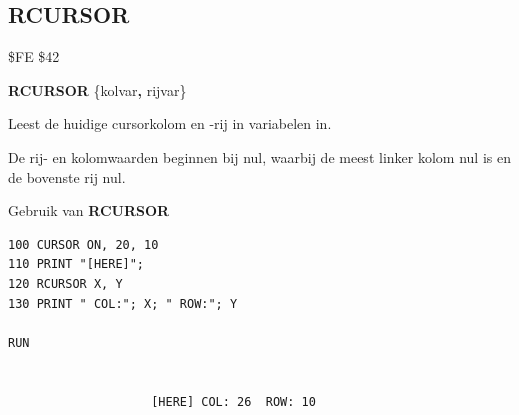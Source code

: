 \subsection{RCURSOR}
\begin{description}[leftmargin=2cm,style=nextline]
\item [Token:]    \$FE \$42

\item [Formaat:]   {\bf RCURSOR} \{kolvar{\bf,} rijvar\}

\item [Gebruik:]    Leest de huidige cursorkolom en -rij in variabelen in.

\item [Opmerkingen:]  De rij- en kolomwaarden beginnen bij nul, waarbij de meest linker kolom nul is en de bovenste rij nul.

\item [Voorbeeld:]  Gebruik van {\bf RCURSOR}

\begin{tcolorbox}[colback=black,coltext=white]
\verbatimfont{\codefont}
\begin{verbatim}
100 CURSOR ON, 20, 10
110 PRINT "[HERE]";
120 RCURSOR X, Y
130 PRINT " COL:"; X; " ROW:"; Y

RUN


                    [HERE] COL: 26  ROW: 10
\end{verbatim}
\end{tcolorbox}
\end{description}


\newpage
